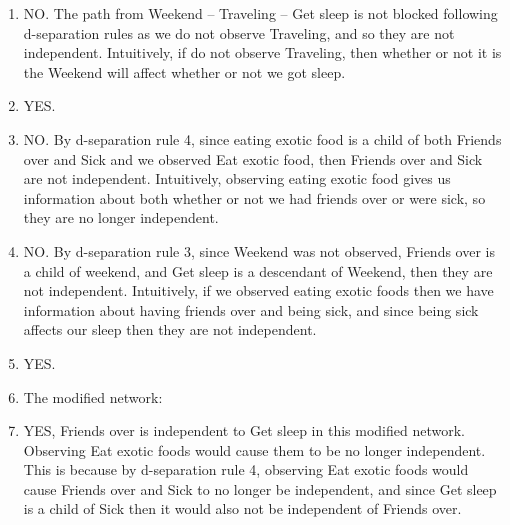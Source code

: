 \documentclass[submit]{harvardml}
\newcommand{\attr}[1]{\textsf{#1}}
\begin{document}
\begin{enumerate}
  \item NO. The path from Weekend -- Traveling -- Get sleep is not blocked following d-separation rules as we do not observe Traveling, and so they are not independent. Intuitively, if do not observe Traveling, then whether or not it is the Weekend will affect whether or not we got sleep.
  \item YES.
  \item NO. By d-separation rule 4, since eating exotic food is a child of both Friends over and Sick and we observed Eat exotic food, then Friends over and Sick are not independent. Intuitively, observing eating exotic food gives us information about both whether or not we had friends over or were sick, so they are no longer independent.
  \item NO. By d-separation rule 3, since Weekend was not observed, Friends over is a child of weekend, and Get sleep is a descendant of Weekend, then they are not independent. Intuitively, if we observed eating exotic foods then we have information about having friends over and being sick, and since being sick affects our sleep then they are not independent.
  \item YES.
  \item The modified network:
  \begin{center}
\end{center}
  \item YES, Friends over is independent to Get sleep in this modified network. Observing Eat exotic foods would cause them to be no longer independent. This is because by d-separation rule 4, observing Eat exotic foods would cause Friends over and Sick to no longer be independent, and since Get sleep is a child of Sick then it would also not be independent of Friends over.
\end{enumerate}
\end{document}
